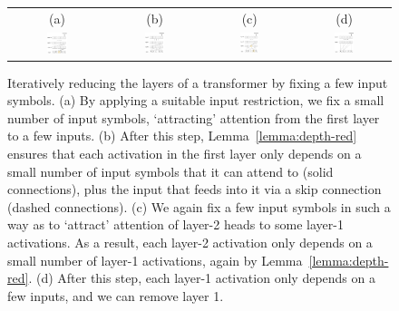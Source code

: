 \documentclass[11pt,a4paper]{article}
\begin{document}
\begin{figure}[ht]
    \centering
    \begin{tabular}{cccc}
    (a) & (b) & (c) & (d) \\
    \includegraphics[width=0.23\textwidth]{figures/sa1_.png} &
        \includegraphics[width=0.23\textwidth]{figures/sa2_b.png}&
    \includegraphics[width=0.22\textwidth]{figures/sa3_b.png} &
        \includegraphics[width=0.23\textwidth]{figures/sa4_b.png}
        \end{tabular}
	\caption{Iteratively reducing the layers of a transformer by fixing a few input symbols. (a) By applying a suitable input restriction, we fix a small number of input symbols, `attracting' attention from the first layer to a few inputs. (b) After this step, Lemma~\ref{lemma:depth-red} ensures that each activation in the first layer only depends on a small number of input symbols that it can attend to (solid connections), plus the input that feeds into it via a skip connection (dashed connections). (c) We again fix a few input symbols in such a way as to `attract' attention of layer-2 heads to some layer-1 activations. As a result, each layer-2 activation only depends on a small number of layer-1 activations, again by Lemma~\ref{lemma:depth-red}. (d) After this step, each layer-1 activation only depends on a few inputs, and we can remove layer 1.
	}
	\label{fig:depth-reduction}
\end{figure}
\end{document}
